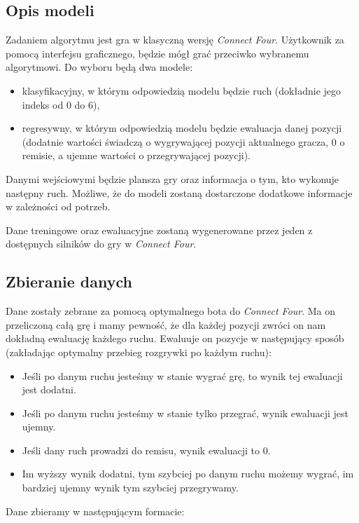 \documentclass[12pt]{article}
\begin{document}
\subsection{Opis modeli}
Zadaniem algorytmu jest gra w klasyczną wersję \textit{Connect Four}. Użytkownik za pomocą interfejsu graficznego, będzie mógł grać przeciwko wybranemu algorytmowi. Do wyboru będą dwa modele:
\begin{itemize}
    \item klasyfikacyjny, w którym odpowiedzią modelu będzie ruch (dokładnie jego indeks od 0 do 6),
    \item regresywny, w którym odpowiedzią modelu będzie ewaluacja danej pozycji (dodatnie wartości świadczą o wygrywającej pozycji aktualnego gracza, 0 o remisie, a ujemne wartości o przegrywającej pozycji).
\end{itemize}

\noindent Danymi wejściowymi będzie plansza gry oraz informacja o tym, kto wykonuje następny ruch. Możliwe, że do modeli zostaną dostarczone dodatkowe informacje w zależności od potrzeb.


Dane treningowe oraz ewaluacyjne zostaną wygenerowane przez jeden z dostępnych silników do gry w \textit{Connect Four}.

\subsection{Zbieranie danych}
Dane zostały zebrane za pomocą optymalnego bota do \textit{Connect Four}. Ma on przeliczoną całą grę i mamy pewność, że dla każdej pozycji zwróci on nam dokładną ewaluację każdego ruchu. Ewaluuje on pozycje w następujący sposób (zakładając optymalny przebieg rozgrywki po każdym ruchu):

\begin{itemize}
    \item Jeśli po danym ruchu jesteśmy w stanie wygrać grę, to wynik tej ewaluacji jest dodatni.
    \item Jeśli po danym ruchu jesteśmy w stanie tylko przegrać, wynik ewaluacji jest ujemny.
    \item Jeśli dany ruch prowadzi do remisu, wynik ewaluacji to 0.
    \item Im wyższy
          wynik dodatni, tym szybciej po danym ruchu możemy wygrać, im bardziej ujemny wynik tym szybciej przegrywamy.
\end{itemize}

Dane zbieramy w następującym formacie:
\end{document}
